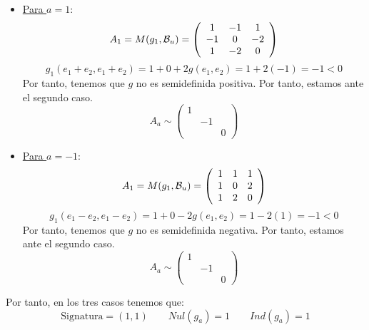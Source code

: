 \documentclass[12pt]{article}
\begin{document}
\begin{ejercicio}
\begin{itemize}
        \item \underline{Para $a=1$}:
        \begin{equation*}
            A_1 = M(g_1, \mathcal{B}_u) = \left(\begin{array}{ccc}
                1 & -1 & 1 \\
                -1 & 0 & -2 \\
                1 & -2 & 0
            \end{array}\right)
        \end{equation*}
        \begin{equation*}
            g_1(e_1+e_2, e_1+e_2) = 1 +0 +2g(e_1, e_2) = 1+2(-1) = -1 <0
        \end{equation*}
        Por tanto, tenemos que $g$ no es semidefinida positiva. Por tanto, estamos ante el segundo caso.
        \begin{equation*}
            A_a\sim \left(\begin{array}{ccc}
             1 \\
              & -1 \\
              && 0
            \end{array}\right)
        \end{equation*}

        \item \underline{Para $a=-1$}:
        \begin{equation*}
            A_1 = M(g_1, \mathcal{B}_u) = \left(\begin{array}{ccc}
                1 & 1 & 1 \\
                1 & 0 & 2 \\
                1 & 2 & 0
            \end{array}\right)
        \end{equation*}
        \begin{equation*}
            g_1(e_1-e_2, e_1-e_2) = 1 +0 -2g(e_1, e_2) = 1-2(1) = -1 <0
        \end{equation*}
        Por tanto, tenemos que $g$ no es semidefinida negativa. Por tanto, estamos ante el segundo caso.
        \begin{equation*}
            A_a\sim \left(\begin{array}{ccc}
             1 \\
              & -1 \\
              && 0
            \end{array}\right)
        \end{equation*}
    \end{itemize}
    Por tanto, en los tres casos tenemos que:
    \begin{equation*}
        \text{Signatura}=(1,1)\qquad Nul(g_a)=1 \qquad Ind(g_a)=1
    \end{equation*}


\end{ejercicio}
\end{document}

